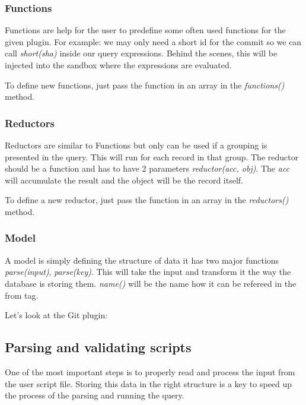 \subsubsection{Functions}

Functions are help for the user to predefine some often used functions for the given plugin.
For example: we may only need a short id for the commit so we can call \textit{short(sha)} inside our query expressions.
Behind the scenes, this will be injected into the sandbox where the expressions are evaluated.

To define new functions, just pass the function in an array in the \textit{functions()} method.

\subsubsection{Reductors}

Reductors are similar to Functions but only can be used if a grouping is presented in the query. This will
run for each record in that group. The reductor should be a function and has to have 2 parameters \textit{reductor(acc, obj)}.
The \textit{acc} will accumulate the result and the object will be the record itself.

To define a new reductor, just pass the function in an array in the \textit{reductors()} method.

\subsubsection{Model}

A model is simply defining the structure of data it has two major functions \textit{parse(input)}, \textit{parse(key)}. 
This will take the input and transform it the way the database is storing them. 
\textit{name()} will be the name how it can be refereed in the from tag.

Let’s look at the Git plugin:



\subsection{Parsing and validating scripts}

One of the most important steps is to properly read and process the input
from the user script file. Storing this data in the right structure is a key
to speed up the process of the parsing and running the query.

